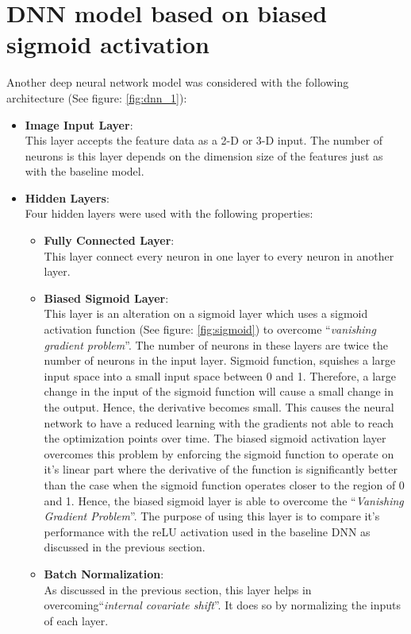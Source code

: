 \section{DNN model based on biased sigmoid activation}
Another deep neural network model was considered with the following architecture (See figure: \ref{fig:dnn_1}):
\begin{itemize}
\item \textbf{Image Input Layer}:\\
This layer accepts the feature data as a 2-D or 3-D input. The number of neurons is this layer depends on the dimension size of the features just as with the baseline model.
\item \textbf{Hidden Layers}:\\
Four hidden layers were used with the following properties:
\begin{itemize}
\item \textbf{Fully Connected Layer}:\\
This layer connect every neuron in one layer to every neuron in another layer.
\item \textbf{Biased Sigmoid Layer}:\\
This layer is an alteration on a sigmoid layer which uses a sigmoid activation function (See figure: \ref{fig:sigmoid}) to overcome \enquote{\textit{vanishing gradient problem}}. The number of neurons in these layers are twice the number of neurons in the input layer. Sigmoid function, squishes a large input space into a small input space between 0 and 1. Therefore, a large change in the input of the sigmoid function will cause a small change in the output. Hence, the derivative becomes small. This causes the neural network to have a reduced learning with the gradients not able to reach the optimization points over time. The biased sigmoid activation layer overcomes this problem by enforcing the sigmoid function to operate on it's linear part where the derivative of the function is significantly better than the case when the sigmoid function operates closer to the region of 0 and 1. Hence, the biased sigmoid layer is able to overcome the \enquote{\textit{Vanishing Gradient Problem}}. The purpose of using this layer is to compare it's performance with the reLU activation used in the baseline DNN as discussed in the previous section. 
\item \textbf{Batch Normalization}:\\
As discussed in the previous section, this layer helps in overcoming\enquote{\textit{internal covariate shift}}. It does so by normalizing the inputs of each layer.

\end{itemize}
\end{itemize}
